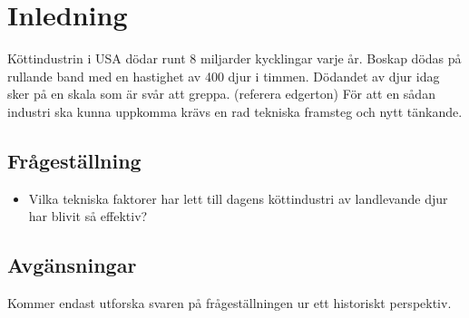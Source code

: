 \section{Inledning}
Köttindustrin i USA dödar runt 8 miljarder kycklingar varje år. Boskap dödas på rullande band med en hastighet av 400 djur i timmen. Dödandet av djur idag sker på en skala som är svår att greppa. (referera edgerton) 
\newline
\newline
För att en sådan industri ska kunna uppkomma krävs en rad tekniska framsteg och nytt tänkande.  

\subsection{Frågeställning}
\begin{itemize}
	\item Vilka tekniska faktorer har lett till dagens köttindustri av landlevande djur har blivit så effektiv?
\end{itemize}

\subsection{Avgänsningar}
Kommer endast utforska svaren på frågeställningen ur ett historiskt perspektiv. 